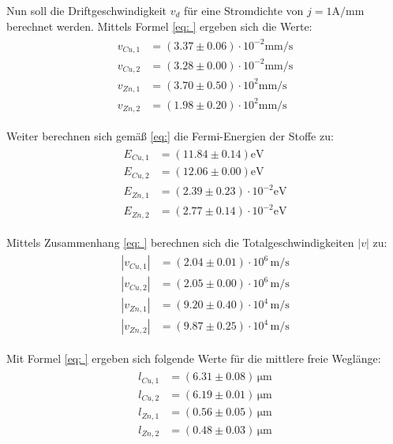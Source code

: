Nun soll die Driftgeschwindigkeit $v_d$ für eine Stromdichte von $j = 1 \si{\ampere \per \milli \meter}$ berechnet werden. Mittels Formel
\eqref{eq: } ergeben sich die Werte:
\begin{align}
\begin{aligned}
v_{Cu,1} &= (3.37 \pm 0.06)\cdot 10^{-2}  \si{\milli\meter\per\second}  \\
v_{Cu,2} &= (3.28 \pm 0.00)\cdot 10^{-2}  \si{\milli\meter\per\second}  \\
v_{Zn,1} &= (3.70 \pm 0.50)\cdot 10^{ 2}   \si{\milli\meter\per\second} \\
v_{Zn,2} &= (1.98 \pm 0.20)\cdot 10^{ 2}   \si{\milli\meter\per\second}
\end{aligned}
\end{align}

Weiter berechnen sich gemäß \eqref{eq:} die Fermi-Energien der Stoffe zu:
\begin{align}
\begin{aligned}
E_{Cu,1} &= (11.84 \pm 0.14)  \si{\eV}  \\
E_{Cu,2} &= (12.06 \pm 0.00)  \si{\eV}  \\
E_{Zn,1} &= (2.39 \pm 0.23)\cdot 10^{-2}   \si{\eV} \\
E_{Zn,2} &= (2.77 \pm 0.14)\cdot 10^{-2}  \si{\eV}
\end{aligned}
\end{align}

Mittels Zusammenhang \eqref{eq: } berechnen sich die Totalgeschwindigkeiten $\left| v \right| $ zu:
\begin{align}
\begin{aligned}
\left|v_{Cu,1}\right| &= (2.04 \pm 0.01)\cdot 10^6 \, \si{\meter \per \second}  \\
\left|v_{Cu,2}\right| &= (2.05 \pm 0.00)\cdot 10^6 \, \si{\meter \per \second}  \\
\left|v_{Zn,1}\right| &= (9.20 \pm 0.40)\cdot 10^4 \, \si{\meter \per \second}  \\
\left|v_{Zn,2}\right| &= (9.87 \pm 0.25)\cdot 10^4 \, \si{\meter \per \second}
\end{aligned}
\end{align}

Mit Formel \eqref{eq: } ergeben sich folgende Werte für die mittlere freie Weglänge:
\begin{align}
\begin{aligned}
l_{Cu,1} &= (6.31 \pm 0.08) \, \si{\micro\meter}  \\
l_{Cu,2} &= (6.19 \pm 0.01) \, \si{\micro\meter}  \\
l_{Zn,1} &= (0.56 \pm 0.05) \, \si{\micro\meter}  \\
l_{Zn,2} &= (0.48 \pm 0.03) \, \si{\micro\meter}
\end{aligned}
\end{align}


